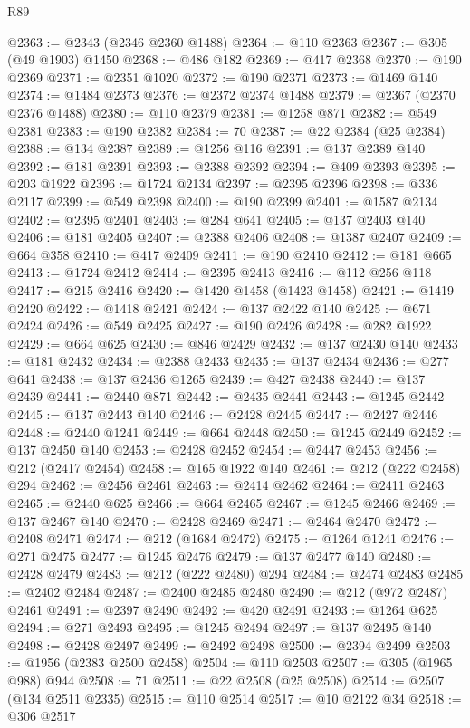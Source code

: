 \begin{lexlean}{R89}
\begin{coremodule}
@2363 := @2343 (@2346 @2360 @1488)
@2364 := @110 @2363
@2367 := @305 (@49 @1903) @1450
@2368 := @486 @182
@2369 := @417 @2368
@2370 := @190 @2369
@2371 := @2351 @1020
@2372 := @190 @2371
@2373 := @1469 @140
@2374 := @1484 @2373
@2376 := @2372 @2374 @1488
@2379 := @2367 (@2370 @2376 @1488)
@2380 := @110 @2379
@2381 := @1258 @871
@2382 := @549 @2381
@2383 := @190 @2382
@2384 := 70
@2387 := @22 @2384 (@25 @2384)
@2388 := @134 @2387
@2389 := @1256 @116
@2391 := @137 @2389 @140
@2392 := @181 @2391
@2393 := @2388 @2392
@2394 := @409 @2393
@2395 := @203 @1922
@2396 := @1724 @2134
@2397 := @2395 @2396
@2398 := @336 @2117
@2399 := @549 @2398
@2400 := @190 @2399
@2401 := @1587 @2134
@2402 := @2395 @2401
@2403 := @284 @641
@2405 := @137 @2403 @140
@2406 := @181 @2405
@2407 := @2388 @2406
@2408 := @1387 @2407
@2409 := @664 @358
@2410 := @417 @2409
@2411 := @190 @2410
@2412 := @181 @665
@2413 := @1724 @2412
@2414 := @2395 @2413
@2416 := @112 @256 @118
@2417 := @215 @2416
@2420 := @1420 @1458 (@1423 @1458)
@2421 := @1419 @2420
@2422 := @1418 @2421
@2424 := @137 @2422 @140
@2425 := @671 @2424
@2426 := @549 @2425
@2427 := @190 @2426
@2428 := @282 @1922
@2429 := @664 @625
@2430 := @846 @2429
@2432 := @137 @2430 @140
@2433 := @181 @2432
@2434 := @2388 @2433
@2435 := @137 @2434
@2436 := @277 @641
@2438 := @137 @2436 @1265
@2439 := @427 @2438
@2440 := @137 @2439
@2441 := @2440 @871
@2442 := @2435 @2441
@2443 := @1245 @2442
@2445 := @137 @2443 @140
@2446 := @2428 @2445
@2447 := @2427 @2446
@2448 := @2440 @1241
@2449 := @664 @2448
@2450 := @1245 @2449
@2452 := @137 @2450 @140
@2453 := @2428 @2452
@2454 := @2447 @2453
@2456 := @212 (@2417 @2454)
@2458 := @165 @1922 @140
@2461 := @212 (@222 @2458) @294
@2462 := @2456 @2461
@2463 := @2414 @2462
@2464 := @2411 @2463
@2465 := @2440 @625
@2466 := @664 @2465
@2467 := @1245 @2466
@2469 := @137 @2467 @140
@2470 := @2428 @2469
@2471 := @2464 @2470
@2472 := @2408 @2471
@2474 := @212 (@1684 @2472)
@2475 := @1264 @1241
@2476 := @271 @2475
@2477 := @1245 @2476
@2479 := @137 @2477 @140
@2480 := @2428 @2479
@2483 := @212 (@222 @2480) @294
@2484 := @2474 @2483
@2485 := @2402 @2484
@2487 := @2400 @2485 @2480
@2490 := @212 (@972 @2487) @2461
@2491 := @2397 @2490
@2492 := @420 @2491
@2493 := @1264 @625
@2494 := @271 @2493
@2495 := @1245 @2494
@2497 := @137 @2495 @140
@2498 := @2428 @2497
@2499 := @2492 @2498
@2500 := @2394 @2499
@2503 := @1956 (@2383 @2500 @2458)
@2504 := @110 @2503
@2507 := @305 (@1965 @988) @944
@2508 := 71
@2511 := @22 @2508 (@25 @2508)
@2514 := @2507 (@134 @2511 @2335)
@2515 := @110 @2514
@2517 := @10 @2122 @34
@2518 := @306 @2517

\end{coremodule}
\end{lexlean}
